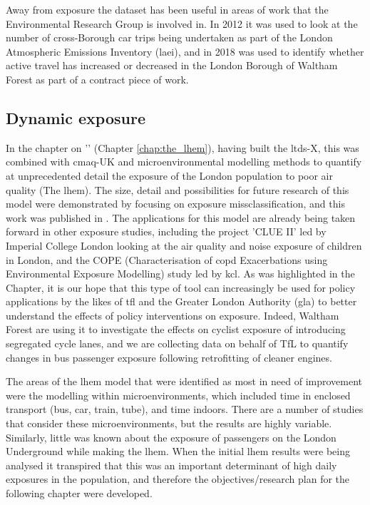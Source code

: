 Away from exposure the dataset has been useful in areas of work that the Environmental Research Group is involved in. In 2012 it was used to look at the number of cross-Borough car trips being undertaken as part of the London Atmospheric Emissions Inventory (\gls{laei}), and in 2018 was used to identify whether active travel has increased or decreased in the London Borough of Waltham Forest as part of a contract piece of work.\\

\subsection{Dynamic exposure}
\label{dynamic_exposure_wrapup}

In the chapter on '' (Chapter \ref{chap:the_lhem}), having built the \gls{ltds}-X, this was combined with \gls{cmaq}-UK and microenvironmental modelling methods to quantify at unprecedented detail the exposure of the London population to poor air quality (The \gls{lhem}). The size, detail and possibilities for future research of this model were demonstrated by focusing on exposure missclassification, and this work was published in \cite{Smith2016} . The applications for this model are already being taken forward in other exposure studies, including the project 'CLUE II' led by Imperial College London looking at the air quality and noise exposure of children in London, and the COPE (Characterisation of \gls{copd} Exacerbations using Environmental Exposure Modelling) study led by \gls{kcl}. As was highlighted in the Chapter, it is our hope that this type of tool can increasingly be used for policy applications by the likes of \gls{tfl} and the Greater London Authority (\gls{gla}) to better understand the effects of policy interventions on exposure. Indeed, Waltham Forest are using it to investigate the effects on cyclist exposure of introducing segregated cycle lanes, and we are collecting data on behalf of TfL to quantify changes in bus passenger exposure following retrofitting of cleaner engines.

The areas of the \gls{lhem} model that were identified as most in need of improvement were the modelling within microenvironments, which included time in enclosed transport (bus, car, train, tube), and time indoors. There are a number of studies that consider these microenvironments, but the results are highly variable. Similarly, little was known about the exposure of passengers on the London Underground while making the \gls{lhem}. When the initial \gls{lhem} results were being analysed it transpired that this was an important determinant of high daily exposures in the population, and therefore the objectives/research plan for the following chapter were developed.\\

